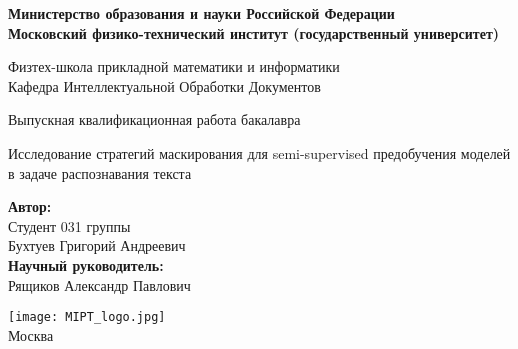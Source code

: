 \begin{center}
    \large\textbf{Министерство образования и науки Российской Федерации \\
    Московский физико-технический институт (государственный
    университет)} \\
    \vspace{1cm}

    Физтех-школа прикладной математики и информатики \\

    Кафедра Интеллектуальной Обработки Документов \\

    \vspace{3em}

    Выпускная квалификационная работа бакалавра
\end{center}

\begin{center}
    \vspace{\fill}
    \LARGE{Исследование стратегий маскирования для semi-supervised предобучения моделей в задаче распознавания текста}

    \vspace{\fill}
\end{center}


\begin{flushright}
    \textbf{Автор:} \\
    Студент 031 группы \\
    Бухтуев Григорий Андреевич \\
    \vspace{2em}
    \textbf{Научный руководитель:} \\
    Рящиков Александр Павлович \\
\end{flushright}

\vspace{7em}

\begin{center}
    \texttt{[image: MIPT\_logo.jpg]}\\
    Москва \the\year{}
\end{center}

\thispagestyle{empty}

\newpage
\setcounter{page}{2}
\fancyfoot[c]{\thepage}
\fancyhead[R]{}